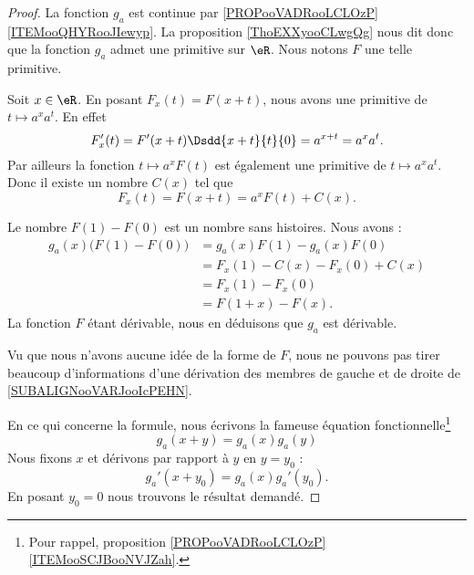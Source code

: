 \begin{proof}
	La fonction \( g_a\) est continue par \ref{PROPooVADRooLCLOzP}\ref{ITEMooQHYRooJIewyp}. La proposition \ref{ThoEXXyooCLwgQg} nous dit donc que la fonction \( g_a\) admet une primitive sur \( \eR\). Nous notons \( F\) une telle primitive.

	Soit \( x\in \eR\). En posant \( F_x(t)=F(x+t)\), nous avons une primitive de \( t\mapsto a^xa^t\). En effet
	\begin{equation}
		F_x'(t)=F'(x+t)\Dsdd{ x+t }{t}{0}=a^{x+t}=a^xa^t.
	\end{equation}
	Par ailleurs la fonction \( t\mapsto a^xF(t)\) est également une primitive de \( t\mapsto a^xa^t\). Donc il existe un nombre \( C(x)\) tel que
	\begin{equation}
		F_x(t)=F(x+t)=a^xF(t)+C(x).
	\end{equation}

	Le nombre \( F(1)-F(0)\) est un nombre sans histoires. Nous avons :
	\begin{subequations}        \label{SUBALIGNooVARJooIcPEHN}
		\begin{align}
			g_a(x)\big( F(1)-F(0) \big) & =g_a(x)F(1)-g_a(x)F(0)   \\
			                            & =F_x(1)-C(x)-F_x(0)+C(x) \\
			                            & =F_x(1)-F_x(0)           \\
			                            & =F(1+x)-F(x).
		\end{align}
	\end{subequations}
	La fonction \( F\) étant dérivable, nous en déduisons que \( g_a\) est dérivable.

	Vu que nous n'avons aucune idée de la forme de \( F\), nous ne pouvons pas tirer beaucoup d'informations d'une dérivation des membres de gauche et de droite de \eqref{SUBALIGNooVARJooIcPEHN}.

	En ce qui concerne la formule, nous écrivons la fameuse équation fonctionnelle\footnote{Pour rappel, proposition \ref{PROPooVADRooLCLOzP}\ref{ITEMooSCJBooNVJZah}.}
	\begin{equation}
		g_a(x+y)=g_a(x)g_a(y)
	\end{equation}
	Nous fixons \( x\) et dérivons par rapport à \( y\) en \( y=y_0\) :
	\begin{equation}
		g_a'(x+y_0)=g_a(x)g_a'(y_0).
	\end{equation}
	En posant \( y_0=0\) nous trouvons le résultat demandé.
\end{proof}

